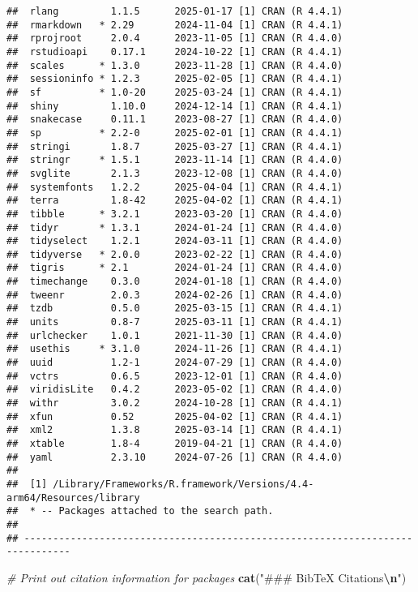 \documentclass[
]{article}
\newenvironment{Shaded}{\begin{snugshade}}{\end{snugshade}}
\newcommand{\CommentTok}[1]{\textcolor[rgb]{0.56,0.35,0.01}{\textit{#1}}}
\newcommand{\FunctionTok}[1]{\textcolor[rgb]{0.13,0.29,0.53}{\textbf{#1}}}
\newcommand{\NormalTok}[1]{#1}
\newcommand{\SpecialCharTok}[1]{\textcolor[rgb]{0.81,0.36,0.00}{\textbf{#1}}}
\newcommand{\StringTok}[1]{\textcolor[rgb]{0.31,0.60,0.02}{#1}}
\begin{document}
\begin{verbatim}
##  rlang         1.1.5      2025-01-17 [1] CRAN (R 4.4.1)
##  rmarkdown   * 2.29       2024-11-04 [1] CRAN (R 4.4.1)
##  rprojroot     2.0.4      2023-11-05 [1] CRAN (R 4.4.0)
##  rstudioapi    0.17.1     2024-10-22 [1] CRAN (R 4.4.1)
##  scales      * 1.3.0      2023-11-28 [1] CRAN (R 4.4.0)
##  sessioninfo * 1.2.3      2025-02-05 [1] CRAN (R 4.4.1)
##  sf          * 1.0-20     2025-03-24 [1] CRAN (R 4.4.1)
##  shiny         1.10.0     2024-12-14 [1] CRAN (R 4.4.1)
##  snakecase     0.11.1     2023-08-27 [1] CRAN (R 4.4.0)
##  sp          * 2.2-0      2025-02-01 [1] CRAN (R 4.4.1)
##  stringi       1.8.7      2025-03-27 [1] CRAN (R 4.4.1)
##  stringr     * 1.5.1      2023-11-14 [1] CRAN (R 4.4.0)
##  svglite       2.1.3      2023-12-08 [1] CRAN (R 4.4.0)
##  systemfonts   1.2.2      2025-04-04 [1] CRAN (R 4.4.1)
##  terra         1.8-42     2025-04-02 [1] CRAN (R 4.4.1)
##  tibble      * 3.2.1      2023-03-20 [1] CRAN (R 4.4.0)
##  tidyr       * 1.3.1      2024-01-24 [1] CRAN (R 4.4.0)
##  tidyselect    1.2.1      2024-03-11 [1] CRAN (R 4.4.0)
##  tidyverse   * 2.0.0      2023-02-22 [1] CRAN (R 4.4.0)
##  tigris      * 2.1        2024-01-24 [1] CRAN (R 4.4.0)
##  timechange    0.3.0      2024-01-18 [1] CRAN (R 4.4.0)
##  tweenr        2.0.3      2024-02-26 [1] CRAN (R 4.4.0)
##  tzdb          0.5.0      2025-03-15 [1] CRAN (R 4.4.1)
##  units         0.8-7      2025-03-11 [1] CRAN (R 4.4.1)
##  urlchecker    1.0.1      2021-11-30 [1] CRAN (R 4.4.0)
##  usethis     * 3.1.0      2024-11-26 [1] CRAN (R 4.4.1)
##  uuid          1.2-1      2024-07-29 [1] CRAN (R 4.4.0)
##  vctrs         0.6.5      2023-12-01 [1] CRAN (R 4.4.0)
##  viridisLite   0.4.2      2023-05-02 [1] CRAN (R 4.4.0)
##  withr         3.0.2      2024-10-28 [1] CRAN (R 4.4.1)
##  xfun          0.52       2025-04-02 [1] CRAN (R 4.4.1)
##  xml2          1.3.8      2025-03-14 [1] CRAN (R 4.4.1)
##  xtable        1.8-4      2019-04-21 [1] CRAN (R 4.4.0)
##  yaml          2.3.10     2024-07-26 [1] CRAN (R 4.4.0)
## 
##  [1] /Library/Frameworks/R.framework/Versions/4.4-arm64/Resources/library
##  * -- Packages attached to the search path.
## 
## ------------------------------------------------------------------------------
\end{verbatim}

\begin{Shaded}
\begin{Highlighting}[]
\CommentTok{\# Print out citation information for packages}
\FunctionTok{cat}\NormalTok{(}\StringTok{"\#\#\# BibTeX Citations}\SpecialCharTok{\textbackslash{}n}\StringTok{"}\NormalTok{)}
\end{Highlighting}
\end{Shaded}
\end{document}
